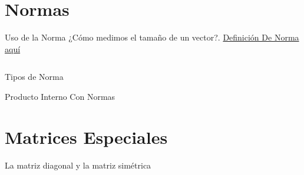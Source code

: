 
\section{Normas}
\label{sec:norms}

\begin{frame}{Uso de la Norma}
  ¿Cómo medimos el tamaño de un vector?. \href{https://en.wikipedia.org/wiki/Norm_(mathematics)}{Definición De Norma aquí}

  \begin{columns}[t]
  
    
  \end{columns}

\end{frame}


\begin{frame}{Tipos de Norma}
    
\end{frame}

\begin{frame}{Producto Interno Con Normas}
  
\end{frame}

\section{Matrices Especiales}
\label{sec:special-matrices}


\begin{frame}{La matriz diagonal y la matriz simétrica}

\end{frame}

